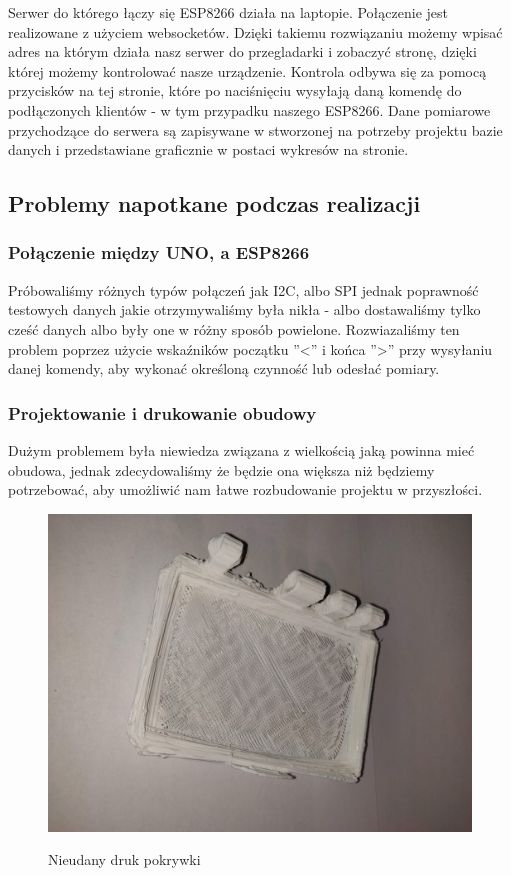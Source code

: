 \documentclass[12pt]{article}
\begin{document}
Serwer do którego łączy się ESP8266 działa na laptopie. Połączenie jest realizowane z użyciem websocketów. Dzięki takiemu rozwiązaniu możemy wpisać adres na którym działa nasz serwer do przegladarki i zobaczyć stronę, dzięki której możemy kontrolować nasze urządzenie. Kontrola odbywa się za pomocą przycisków na tej stronie, które po naciśnięciu wysyłają daną komendę do podłączonych klientów - w tym przypadku naszego ESP8266. Dane pomiarowe przychodzące do serwera są zapisywane w stworzonej na potrzeby projektu bazie danych i przedstawiane graficznie w postaci wykresów na stronie.

\newpage
\subsection{Problemy napotkane podczas realizacji}
\subsubsection{Połączenie między UNO, a ESP8266}
Próbowaliśmy różnych typów połączeń jak I2C, albo SPI jednak poprawność testowych danych jakie otrzymywaliśmy była nikła - albo dostawaliśmy tylko cześć danych albo były one w różny sposób powielone.
Rozwiazaliśmy ten problem poprzez użycie wskaźników początku ''<'' i końca ''>'' przy wysyłaniu danej komendy, aby wykonać określoną czynność lub odesłać pomiary. 
\subsubsection{Projektowanie i drukowanie obudowy}
Dużym problemem była niewiedza związana z wielkością jaką powinna mieć obudowa, jednak zdecydowaliśmy że będzie ona większa niż będziemy potrzebować, aby umożliwić nam łatwe rozbudowanie projektu w przyszłości. 


\begin{figure}[!h]
	\begin{center}
		{\includegraphics[width=12cm]{obudowa_broken.jpg}}
	\end{center}
	\caption{Nieudany druk pokrywki}
\end{figure}
\end{document}
